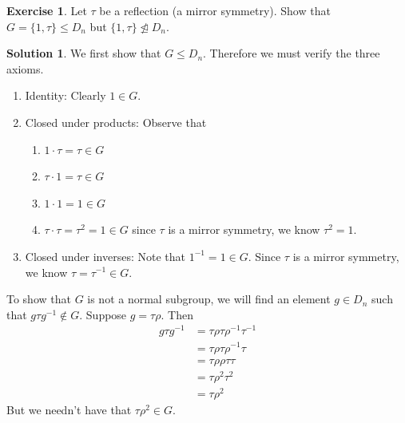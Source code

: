 \documentclass[12pt]{article}
\theoremstyle{definition}
\newtheorem{exercise}{\color{YellowOrange}Exercise}
\theoremstyle{definition}
\newtheorem{solution}{\color{Goldenrod}Solution}
\begin{document}
\begin{exercise}
Let $\tau$ be a reflection (a mirror symmetry). Show that $G = \{1,\tau\} \leq D_n$ but $\{1,\tau\} \not \trianglelefteq D_n$. 
\end{exercise}
\begin{solution}
	We first show that $G \leq D_n$. Therefore we must verify the three axioms.
	\begin{enumerate}
		\item Identity: Clearly $1 \in G$. 
		\item Closed under products: Observe that
		\begin{enumerate}
			\item $1 \cdot \tau = \tau \in G$ 
			\item $\tau \cdot 1 = \tau \in G$ 
			\item $1 \cdot 1 = 1 \in G$ 
			\item $\tau \cdot \tau = \tau^2 = 1 \in G$ since $\tau$ is a mirror symmetry, we know $\tau^2 = 1$.
		\end{enumerate}
		\item Closed under inverses: Note that $1^{-1} = 1 \in G$. Since $\tau$ is a mirror symmetry, we know $\tau = \tau^{-1} \in G$. 
	\end{enumerate}
	To show that $G$ is not a normal subgroup, we will find an element $g \in D_n$ such that $g \tau g^{-1} \not\in G$. Suppose $g = \tau \rho$. Then
	\begin{align*}
		g \tau g^{-1} &= \tau \rho \tau \rho^{-1} \tau^{-1} \\
		&= \tau \rho \tau \rho^{-1} \tau \\
		&= \tau \rho \rho \tau \tau\\
		&= \tau \rho^2 \tau^2 \\
		&= \tau \rho^2
	\end{align*}
	But we needn't have that $\tau \rho^2 \in G$. 
\end{solution}
\end{document}
